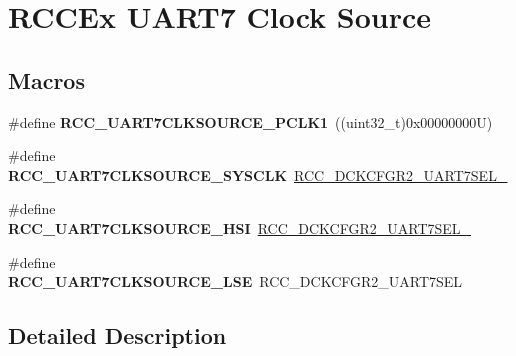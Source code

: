 \hypertarget{group___r_c_c_ex___u_a_r_t7___clock___source}{}\section{R\+C\+C\+Ex U\+A\+R\+T7 Clock Source}
\label{group___r_c_c_ex___u_a_r_t7___clock___source}
\subsection*{Macros}
\begin{DoxyCompactItemize}
\item 
\mbox{\label{group___r_c_c_ex___u_a_r_t7___clock___source_gad8a055b15806cead0eeb191a6d8f0e65}} 
\#define {\bfseries R\+C\+C\+\_\+\+U\+A\+R\+T7\+C\+L\+K\+S\+O\+U\+R\+C\+E\+\_\+\+P\+C\+L\+K1}~((uint32\+\_\+t)0x00000000\+U)
\item 
\mbox{\label{group___r_c_c_ex___u_a_r_t7___clock___source_ga8ff9bf57f6f1fbb372ad9e20ceaae1e7}} 
\#define {\bfseries R\+C\+C\+\_\+\+U\+A\+R\+T7\+C\+L\+K\+S\+O\+U\+R\+C\+E\+\_\+\+S\+Y\+S\+C\+LK}~\mbox{\hyperlink{group___peripheral___registers___bits___definition_gac704660db375be76cd9b833ddb7db4a0}{R\+C\+C\+\_\+\+D\+C\+K\+C\+F\+G\+R2\+\_\+\+U\+A\+R\+T7\+S\+E\+L\+\_}}
\item 
\mbox{\label{group___r_c_c_ex___u_a_r_t7___clock___source_ga3111806bfc93535645e7097bfd446151}} 
\#define {\bfseries R\+C\+C\+\_\+\+U\+A\+R\+T7\+C\+L\+K\+S\+O\+U\+R\+C\+E\+\_\+\+H\+SI}~\mbox{\hyperlink{group___peripheral___registers___bits___definition_ga6c6f4a05c75c182028e3c4b6bfb92018}{R\+C\+C\+\_\+\+D\+C\+K\+C\+F\+G\+R2\+\_\+\+U\+A\+R\+T7\+S\+E\+L\+\_}}
\item 
\mbox{\label{group___r_c_c_ex___u_a_r_t7___clock___source_ga391e0c8bbbb17d9c9d4776c8fedc374c}} 
\#define {\bfseries R\+C\+C\+\_\+\+U\+A\+R\+T7\+C\+L\+K\+S\+O\+U\+R\+C\+E\+\_\+\+L\+SE}~R\+C\+C\+\_\+\+D\+C\+K\+C\+F\+G\+R2\+\_\+\+U\+A\+R\+T7\+S\+EL
\end{DoxyCompactItemize}


\subsection{Detailed Description}
